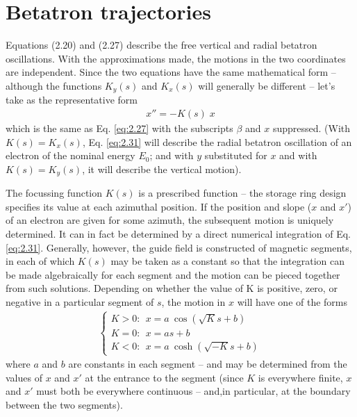 \documentclass[../sands-adaptation.tex]{subfiles}
\begin{document}
\section{Betatron trajectories}\label{sec:2.5}

Equations (2.20) and (2.27) describe the free vertical and radial betatron oscillations. With the approximations made, the motions in the two coordinates are independent. Since the two equations have the same mathematical form -- although the functions $K_y(s)$ and $K_x(s)$ will generally be different -- let’s take as the representative form
\begin{align}
	x'' = -K(s) \; x \label{eq:2.31}
\end{align}
which is the same as Eq. \eqref{eq:2.27} with the subscripts $\beta$ and $x$ suppressed. (With $K(s) = K_x(s)$, Eq. \eqref{eq:2.31} will describe the radial betatron oscillation of an electron of the nominal energy $E_0$; and with $y$ substituted for $x$ and with $K(s) = K_y(s)$, it will describe the vertical motion).

The focussing function $K(s)$ is a prescribed function -- the storage ring design specifies its value at each azimuthal position. If the position and slope ($x$ and $x'$) of an electron are given for some azimuth, the subsequent motion is uniquely determined. It can in fact be determined by a direct numerical integration of Eq. \eqref{eq:2.31}. Generally, however, the guide field is constructed of magnetic segments, in each of which $K(s)$ may be taken as a constant so that the integration can be made algebraically for each segment and the motion can be pieced together from such solutions. Depending on whether the value of K is positive, zero, or negative in a particular segment of $s$, the motion in $x$ will have one of the forms
\begin{align}
	\left\{\begin{array}{l}
	K>0: \ \ x = a\ \cos(\sqrt{K}s+b) \\
	K=0: \ \ x = as+b \\
	K<0: \ \ x = a\ \cosh(\sqrt{-K}s+b)
	\end{array}\right. \label{eq:2.32}
\end{align}
where $a$ and $b$ are constants in each segment -- and may be determined from the values of $x$ and $x'$ at the entrance to the segment (since $K$ is everywhere finite, $x$ and $x'$ must both be everywhere continuous -- and,in particular, at the boundary between the two segments).
\end{document}
